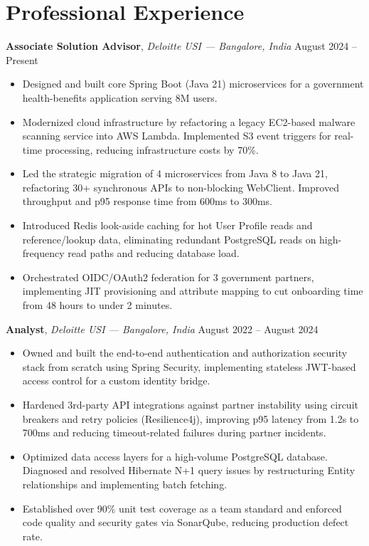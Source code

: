 \documentclass[10pt]{article}
\newcommand{\resumeentry}[3]{%
      \vspace{5pt}%
      \noindent\textbf{#1}, \textit{#2} \hfill #3\par
      \vspace{5pt}%
}
\begin{document}
\section{Professional Experience}

\resumeentry{Associate Solution Advisor}{Deloitte USI --- Bangalore, India}{August 2024 -- Present}
\begin{itemize}[itemsep=3pt]
  \item Designed and built core Spring Boot (Java 21) microservices for a government
        health-benefits application serving 8M users.
  \item Modernized cloud infrastructure by refactoring a legacy EC2-based malware scanning
        service into AWS Lambda. Implemented S3 event triggers for real-time processing,
        reducing infrastructure costs by 70\%.
  \item Led the strategic migration of 4 microservices from Java 8 to Java 21, refactoring
        30+ synchronous APIs to non-blocking WebClient. Improved throughput and p95 response
        time from 600ms to 300ms.
  \item Introduced Redis look-aside caching for hot User Profile reads and reference/lookup
        data, eliminating redundant PostgreSQL reads on high-frequency read paths and reducing
        database load.
  \item Orchestrated OIDC/OAuth2 federation for 3 government partners, implementing JIT
        provisioning and attribute mapping to cut onboarding time from 48 hours to under
        2 minutes.
\end{itemize}

\smallskip

\resumeentry{Analyst}{Deloitte USI --- Bangalore, India}{August 2022 -- August 2024}
\begin{itemize}[itemsep=3pt]
  \item Owned and built the end-to-end authentication and authorization security stack from
        scratch using Spring Security, implementing stateless JWT-based access control for a
        custom identity bridge.
  \item Hardened 3rd-party API integrations against partner instability using circuit breakers
        and retry policies (Resilience4j), improving p95 latency from 1.2s to 700ms and
        reducing timeout-related failures during partner incidents.
  \item Optimized data access layers for a high-volume PostgreSQL database. Diagnosed and
        resolved Hibernate N+1 query issues by restructuring Entity relationships and
        implementing batch fetching.
  \item Established over 90\% unit test coverage as a team standard and enforced code quality
        and security gates via SonarQube, reducing production defect rate.
\end{itemize}
\end{document}

